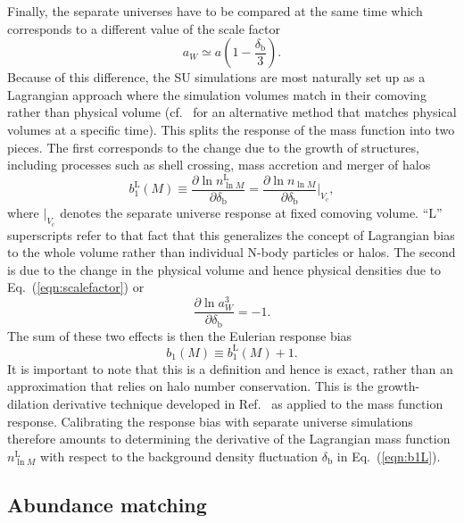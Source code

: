 \documentclass[prd,twocolumn,amsmath,amssymb,floatfix,superscriptaddress]{revtex4-1}
\newcommand{\br}{\textrm{b}}
\newcommand{\Lr}{\textrm{L}}
\newcommand{\lnM}{{\ln\!M}}
\newcommand{\VL}{V_\textrm{c}}
\begin{document}
Finally, the separate universes have to be compared at the
same time which corresponds to a different value of the scale
factor 
\begin{equation}
 a_W\simeq a\left(1-\frac{\delta_\br}{3}\right). 
 \label{eqn:scalefactor}
\end{equation}
Because of this difference, the SU simulations are  most naturally set up as a 
Lagrangian approach where the simulation volumes match in their comoving
rather than physical volume  (cf.~\cite{Lietal:14a} for an alternative method that
matches physical volumes at a specific time).   This splits the response of
the mass function into two pieces.   The first corresponds to the change due to
the growth of structures, including processes such as shell crossing, mass accretion and merger
of halos
\begin{equation}
b_1^\Lr(M) \equiv  \frac{\partial \ln n_\lnM^\Lr}{\partial \delta_\br}= \frac{\partial \ln n_\lnM}{\partial \delta_\br} \Big|_{\VL} ,
\label{eqn:b1L}
\end{equation}
where $|_{\VL}$ denotes the separate universe response at fixed comoving volume.  ``$\Lr$'' superscripts
refer to that fact that this 
generalizes the concept of Lagrangian bias to the whole volume rather than
individual N-body particles or halos.    The second is due to the change in the physical volume and hence physical
densities due to Eq.~(\ref{eqn:scalefactor}) or
\begin{equation}
\frac{\partial \ln a_W^3 }{\partial \delta_\br} = -1.
\end{equation}
The sum of these two effects is then the Eulerian response bias
\begin{equation}
    b_1(M) \equiv b_1^\Lr(M) + 1.
\label{eqn:biaseulerian}
\end{equation}
It is important to note that this is a definition and hence is exact, rather than an approximation that relies on halo number conservation.   This is the growth-dilation derivative
technique developed in Ref.~\cite{Lietal:14b} as applied to the mass function response.
Calibrating the response bias with separate universe simulations therefore amounts to
determining the derivative of the Lagrangian mass function $n_\lnM^\Lr$ with respect to 
the background density fluctuation $\delta_\br$ in Eq.~(\ref{eqn:b1L}).  

\subsection{Abundance matching}
\label{sub:AM}
\end{document}
